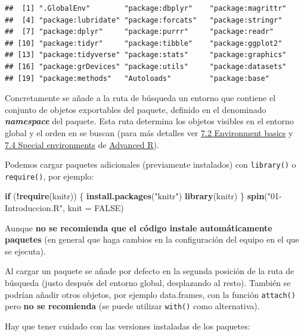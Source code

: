 \documentclass[
]{book}
\newenvironment{Shaded}{\begin{snugshade}}{\end{snugshade}}
\newcommand{\AttributeTok}[1]{\textcolor[rgb]{0.13,0.29,0.53}{#1}}
\newcommand{\ConstantTok}[1]{\textcolor[rgb]{0.56,0.35,0.01}{#1}}
\newcommand{\ControlFlowTok}[1]{\textcolor[rgb]{0.13,0.29,0.53}{\textbf{#1}}}
\newcommand{\FunctionTok}[1]{\textcolor[rgb]{0.13,0.29,0.53}{\textbf{#1}}}
\newcommand{\NormalTok}[1]{#1}
\newcommand{\SpecialCharTok}[1]{\textcolor[rgb]{0.81,0.36,0.00}{\textbf{#1}}}
\newcommand{\StringTok}[1]{\textcolor[rgb]{0.31,0.60,0.02}{#1}}
\theoremstyle{break}
\theoremstyle{nonumberplain}
\begin{document}
\begin{verbatim}
##  [1] ".GlobalEnv"        "package:dbplyr"    "package:magrittr" 
##  [4] "package:lubridate" "package:forcats"   "package:stringr"  
##  [7] "package:dplyr"     "package:purrr"     "package:readr"    
## [10] "package:tidyr"     "package:tibble"    "package:ggplot2"  
## [13] "package:tidyverse" "package:stats"     "package:graphics" 
## [16] "package:grDevices" "package:utils"     "package:datasets" 
## [19] "package:methods"   "Autoloads"         "package:base"
\end{verbatim}

Concretamente se añade a la ruta de búsqueda un entorno que contiene el conjunto de objetos exportables del paquete, definido en el denominado \textbf{\emph{namespace}} del paquete.
Esta ruta determina los objetos visibles en el entorno global y el orden en se buscan (para más detalles ver \href{https://adv-r.hadley.nz/environments.html\#env-basics}{7.2 Environment basics} y \href{https://adv-r.hadley.nz/environments.html\#special-environments}{7.4 Special environments} de \href{https://adv-r.hadley.nz/index.html}{Advanced R}).

Podemos cargar paquetes adicionales (previamente instalados) con \texttt{library()} o \texttt{require()}, por ejemplo:

\begin{Shaded}
\begin{Highlighting}[]
\ControlFlowTok{if}\NormalTok{ (}\SpecialCharTok{!}\FunctionTok{require}\NormalTok{(knitr)) \{}
  \FunctionTok{install.packages}\NormalTok{(}\StringTok{"knitr"}\NormalTok{)}
  \FunctionTok{library}\NormalTok{(knitr)}
\NormalTok{\}}
\FunctionTok{spin}\NormalTok{(}\StringTok{"01{-}Introduccion.R"}\NormalTok{, }\AttributeTok{knit =} \ConstantTok{FALSE}\NormalTok{)}
\end{Highlighting}
\end{Shaded}

Aunque \textbf{no se recomienda que el código instale automáticamente paquetes} (en general que haga cambios en la configuración del equipo en el que se ejecuta).

Al cargar un paquete se añade por defecto en la segunda posición de la ruta de búsqueda (justo después del entorno global, desplazando al resto).
También se podrían añadir otros objetos, por ejemplo data.frames, con la función \texttt{attach()} pero \textbf{no se recomienda} (se puede utilizar \texttt{with()} como alternativa).

Hay que tener cuidado con las versiones instaladas de los paquetes:
\end{document}
